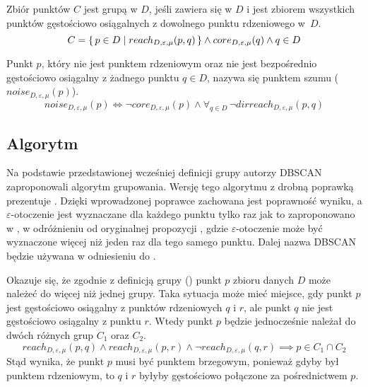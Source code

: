\newline
Zbiór punktów $ C $ jest grupą w $ D $, jeśli zawiera się w $ D $ i jest zbiorem wszystkich punktów gęstościowo osiągalnych z dowolnego punktu rdzeniowego \mbox{w $ D $}. 
\begin{equation}\label{eq:cluster-def}
C = \set{p \in D | reach_{D,\varepsilon,\mu}(p, q)} \land core_{D,\varepsilon,\mu}(q) \land q \in D
\end{equation}

\newline
Punkt $ p $, który nie jest punktem rdzeniowym oraz nie jest bezpośrednio gęstościowo osiągalny z żadnego punktu $q \in D$, nazywa się punktem szumu ($ noise_{D,\varepsilon,\mu}(p) $). 
\begin{equation}
	noise_{D,\varepsilon,\mu}(p) \iff \neg core_{D,\varepsilon,\mu}(p) \land \forall_{q\in D}\,\neg dirreach_{D,\varepsilon,\mu}(p, q)
\end{equation}
	
\subsection{Algorytm}
Na podstawie przedstawionej wcześniej definicji grupy autorzy DBSCAN zaproponowali algorytm grupowania. Wersję tego algorytmu z drobną poprawką prezentuje . Dzięki wprowadzonej poprawce zachowana jest poprawność wyniku, a $ \varepsilon $-otoczenie jest wyznaczane dla każdego punktu tylko raz jak to zaproponowano w \cite{fasterdbscan}, w odróżnieniu od oryginalnej propozycji \cite{dbscan}, gdzie $ \varepsilon $-otoczenie może być wyznaczone więcej niż jeden raz dla tego samego punktu. Dalej nazwa DBSCAN będzie używana w odniesieniu do .

Okazuje się, że zgodnie z definicją grupy () punkt $ p $ zbioru danych $ D $ może należeć do więcej niż jednej grupy. Taka sytuacja może mieć miejsce, gdy punkt $ p $ jest gęstościowo osiągalny z punktów rdzeniowych $ q $ i $ r $, ale punkt $ q $ nie jest gęstościowo osiągalny z punktu $ r $. Wtedy punkt $ p $ będzie jednocześnie należał do dwóch różnych grup $ C_1 $ oraz $ C_2 $.
\begin{equation}
  reach_{D,\varepsilon,\mu}(p, q) \land reach_{D,\varepsilon,\mu}(p, r) \land 
  \neg reach_{D,\varepsilon,\mu}(q, r) \implies
  p \in C_1 \cap C_2
\end{equation}
Stąd wynika, że punkt $ p $ musi być punktem brzegowym, ponieważ gdyby był punktem rdzeniowym, to $ q $ i $ r $ byłyby gęstościowo połączone za pośrednictwem $ p $.

